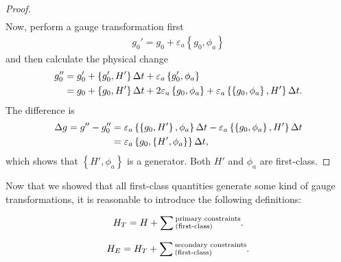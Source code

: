 \begin{proof}
\begin{align}
\end{align}
Now, perform a gauge transformation first
\begin{align}
g_0' = g_0 + \varepsilon_a \left\{ g_0 , \phi_a \right \}
\end{align}
and then calculate the physical change
\begin{align}
g_0'' &= g_0' + \left\{ g_0' , H' \right \} \Delta t + \varepsilon_a \left\{ g_0' , \phi_a \right \} \notag \\
&= g_0 + \left\{ g_0 , H' \right \} \Delta t + 2 \varepsilon_a \left\{ g_0 , \phi_a \right \} + \varepsilon_a \left\{ \left\{ g_0 , \phi_a \right \} , H' \right \} \Delta t.
\end{align}
The difference is 
\begin{align}
\Delta g = g'' - g_0'' &= \varepsilon_a  \left\{ \left\{ g_0 , H' \right \} , \phi_a \right \} \Delta t - \varepsilon_a  \left\{ \left\{ g_0 , \phi_a \right \} , H' \right \} \Delta t \notag \\
&= \varepsilon_a \left\{ g_0 ,  \left\{  H' , \phi_a \right \} \right \} \Delta t ,
\end{align}
which shows that $\left\{  H' , \phi_a \right \}$ is a generator. Both $H'$ and $\phi_a$ are first-class.
\end{proof}

Now that we showed that all first-class quantities generate some kind of gauge transformations, it is reasonable to introduce the following definitions:
\begin{definition}
\begin{align}
H_T = H + \sum {\begin{subarray}{l}\text{primary constraints}\\ \text{(first-class)}\end{subarray}}.
\end{align}
\end{definition}

\begin{definition}
\begin{align}
H_E = H_T + \sum {\begin{subarray}{l}\text{secondary constraints}\\ \text{(first-class)}\end{subarray}}.
\end{align}
\end{definition}

